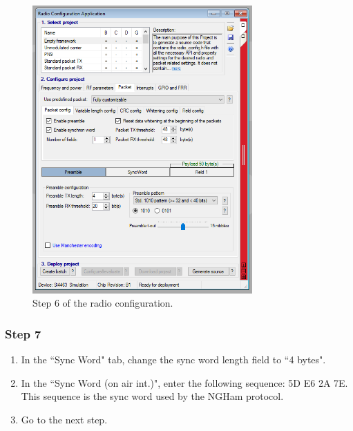 \begin{figure}[!h]
	\begin{center}
		\includegraphics[width=0.75\textwidth]{figures/wds-tutorial-6.png}
		\caption{Step 6 of the radio configuration.}
		\label{fig:wds-tutorial-step-6}
	\end{center}
\end{figure}

\subsubsection{Step 7}

\begin{enumerate}
    \item In the ``Sync Word" tab, change the sync word length field to ``4 bytes".
    \item In the ``Sync Word (on air int.)", enter the following sequence: 5D E6 2A 7E. This sequence is the sync word used by the NGHam protocol.
    \item Go to the next step.
\end{enumerate}

